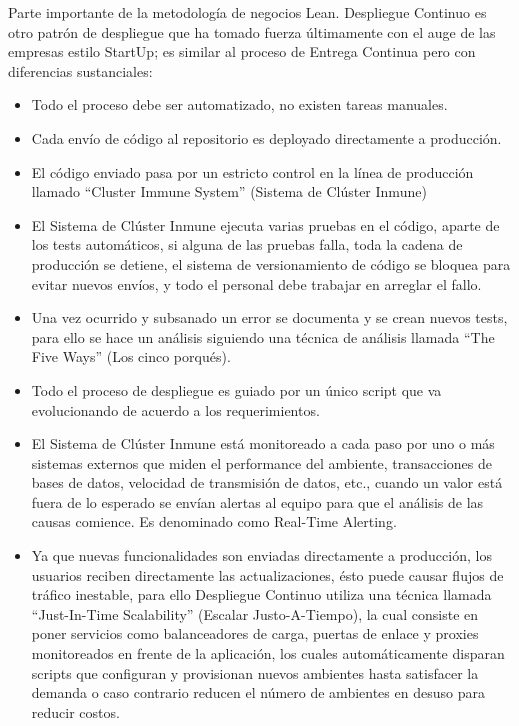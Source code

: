 \documentclass[conference]{IEEEtran}
\begin{document}
Parte importante de la metodología de negocios Lean. Despliegue Continuo es otro patrón de despliegue que ha tomado fuerza últimamente con el auge de las empresas estilo StartUp; es similar al proceso de Entrega Continua pero con diferencias sustanciales:

\begin{itemize}
 \item Todo el proceso debe ser automatizado, no existen tareas manuales.
 \item Cada envío de código al repositorio es deployado directamente a producción.
 \item El código enviado pasa por un estricto control en la línea de producción llamado “Cluster Immune System” (Sistema de Clúster Inmune)
 \item El Sistema de Clúster Inmune ejecuta varias pruebas en el código, aparte de los tests automáticos, si alguna de las pruebas falla, toda la cadena de producción se detiene, el sistema de versionamiento de código se bloquea para evitar nuevos envíos, y todo el personal debe trabajar en arreglar el fallo.
 \item Una vez ocurrido y subsanado un error se documenta y se crean nuevos tests, para ello se hace un análisis siguiendo una técnica de análisis llamada “The Five Ways” (Los cinco porqués).
 \item Todo el proceso de despliegue es guiado por un único script que va evolucionando de acuerdo a los requerimientos.
 \item El Sistema de Clúster Inmune está monitoreado a cada paso por uno o más sistemas externos que miden el performance del ambiente, transacciones de bases de datos, velocidad de transmisión de datos, etc., cuando un valor está fuera de lo esperado se envían alertas al equipo para que el análisis de las causas comience. Es denominado como Real-Time Alerting.
 \item Ya que nuevas funcionalidades son enviadas directamente a producción, los usuarios reciben directamente las actualizaciones, ésto puede causar flujos de tráfico inestable, para ello Despliegue Continuo utiliza una técnica llamada “Just-In-Time Scalability” (Escalar Justo-A-Tiempo), la cual consiste en poner servicios como balanceadores de carga, puertas de enlace y proxies monitoreados en frente de la aplicación, los cuales automáticamente disparan scripts que configuran y provisionan nuevos ambientes hasta satisfacer la demanda o caso contrario reducen el número de ambientes en desuso para reducir costos.
\end{itemize}
\end{document}
